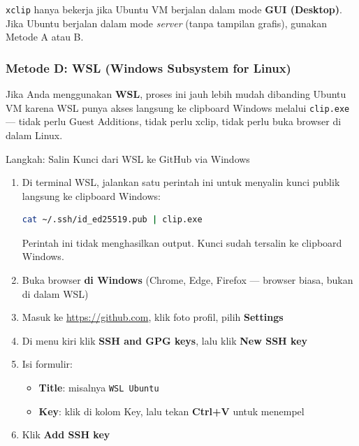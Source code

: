 \documentclass[
    a4paper,
    11pt,
    parskip=half
]{scrartcl}
\begin{document}
\begin{warningbox}
\texttt{xclip} hanya bekerja jika Ubuntu VM berjalan dalam mode \textbf{GUI (Desktop)}. Jika Ubuntu berjalan dalam mode \textit{server} (tanpa tampilan grafis), gunakan Metode A atau B.
\end{warningbox}

\subsubsection*{Metode D: WSL (Windows Subsystem for Linux)}

Jika Anda menggunakan \textbf{WSL}, proses ini jauh lebih mudah dibanding Ubuntu VM karena WSL punya akses langsung ke clipboard Windows melalui \texttt{clip.exe} --- tidak perlu Guest Additions, tidak perlu xclip, tidak perlu buka browser di dalam Linux.

\begin{stepbox}{Langkah: Salin Kunci dari WSL ke GitHub via Windows}
\begin{enumerate}
    \item Di terminal WSL, jalankan satu perintah ini untuk menyalin kunci publik langsung ke clipboard Windows:
\begin{lstlisting}[language=bash]
cat ~/.ssh/id_ed25519.pub | clip.exe
\end{lstlisting}
    Perintah ini tidak menghasilkan output. Kunci sudah tersalin ke clipboard Windows.

    \item Buka browser \textbf{di Windows} (Chrome, Edge, Firefox --- browser biasa, bukan di dalam WSL)

    \item Masuk ke \url{https://github.com}, klik foto profil, pilih \textbf{Settings}

    \item Di menu kiri klik \textbf{SSH and GPG keys}, lalu klik \textbf{New SSH key}

    \item Isi formulir:
        \begin{itemize}
            \item \textbf{Title}: misalnya \texttt{WSL Ubuntu}
            \item \textbf{Key}: klik di kolom Key, lalu tekan \textbf{Ctrl+V} untuk menempel
        \end{itemize}

    \item Klik \textbf{Add SSH key}
\end{enumerate}
\end{stepbox}
\end{document}
